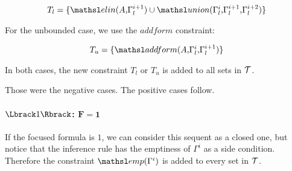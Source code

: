 $$T_l = \{ \elin{A}{\Gamma_l^{i+1}} \cup
\union{\Gamma_l^{i}}{\Gamma_l^{i+1}}{\Gamma_l^{i+2}} \}$$

For the unbounded case, we use the $addform$ constraint:

$$T_u = \{ \addform{A}{\Gamma_l^{i}}{\Gamma_l^{i+1}} \}$$

In both cases, the new constraint $T_l$ or $T_u$ is added to all sets in
$\mathcal{T}$.

\vspace{0.5cm}

Those were the negative cases. The positive cases follow.


\begin{comment}
\paragraph{$\alg{\exists}$: $\mathbf{F = \exists x. A}$\\}
In this case, $\Sscr = \genK : \Gamma^i \Downarrow \exists x. A$ and the
application of the inference rule $[\exists]$ will replace $\Sscr$ in $\Oscr$ by
$\genK : \Gamma^i \Downarrow A\{t/x\}$, where $t$ is a new variable.
\end{comment}

\paragraph{$\alg{1}$: $\mathbf{F = 1}$\\}
If the focused formula is $1$, we can consider this sequent as a closed one, but
notice that the inference rule has the emptiness of $\Gamma^i$ as a side
condition. Therefore the constraint $\emp{\Gamma^i}$ is added to every set in $\mathcal{T}$.

